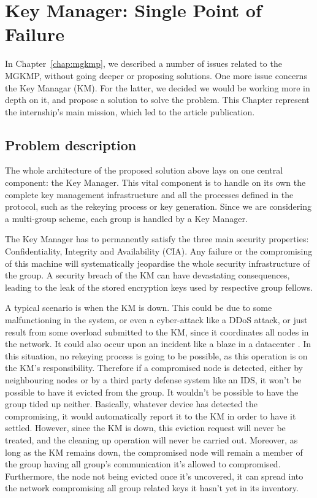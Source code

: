 \chapter{Key Manager: Single Point of Failure}
\label{chap:key_manager}

In Chapter~\ref{chap:mgkmp}, we described a number of issues related to the MGKMP, without going deeper or proposing solutions. One more issue concerns the Key Managar (KM). For the latter, we decided we would be working more in depth on it, and propose a solution to solve the problem. This Chapter represent the internship's main mission, which led to the article publication.

\section{Problem description}
\label{sec:km_problem}

The whole architecture of the proposed solution above lays on one central component: the Key Manager. This vital component is to handle on its own the complete key management infrastructure and all the processes defined in the protocol, such as the rekeying process or key generation. Since we are considering a multi-group scheme, each group is handled by a Key Manager.

The Key Manager has to permanently satisfy the three main security properties: Confidentiality, Integrity and Availability (CIA). Any failure or the compromising of this machine will systematically jeopardise the whole security infrastructure of the group. A security breach of the KM can have devastating consequences, leading to the leak of the stored encryption keys used by respective group fellows.

A typical scenario is when the KM is down. This could be due to some malfunctioning in the system, or even a cyber-attack like a DDoS attack, or just result from some overload submitted to the KM, since it coordinates all nodes in the network. It could also occur upon an incident like a blaze in a datacenter \cite{malwarebytes}. In this situation, no rekeying process is going to be possible, as this operation is on the KM’s responsibility. Therefore if a compromised node is detected, either by neighbouring nodes or by a third party defense system like an IDS, it won’t be possible to have it evicted from the group. It wouldn’t be possible to have the group tided up neither. Basically, whatever device has detected the compromising, it would automatically report it to the KM in order to have it settled. However, since the KM is down, this eviction request will never be treated, and the cleaning up operation will never be carried out. Moreover, as long as the KM remains down, the compromised node will remain a member of the group having all group’s communication it’s allowed to compromised. Furthermore, the node not being evicted once it’s uncovered, it can spread into the network compromising all group related keys it hasn’t yet in its inventory.

